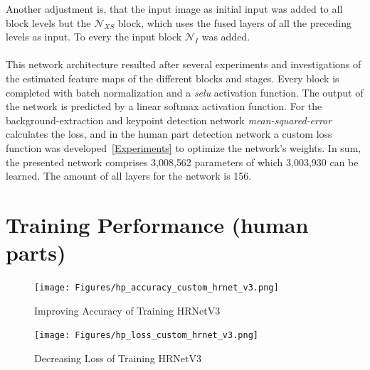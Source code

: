 Another adjustment is, that the input image as initial input was added to all block levels but the $\mathcal{N}_{XS}$
block, which uses the fused layers of all the preceding levels as input.
To every the input block $\mathcal{N}_I$ was added.
\\\mbox{}\\
This network architecture resulted after several experiments and investigations of the estimated feature maps of the
different blocks and stages.
Every block is completed with batch normalization and a \textit{selu} activation function.
The output of the network is predicted by a linear softmax activation function.
For the background-extraction and keypoint detection network \textit{mean-squared-error} calculates the loss, and in the
human part detection network a custom loss function was developed~\autoref{Experiments} to optimize the network's weights.
In sum, the presented network comprises 3,008,562 parameters of which 3,003,930 can be learned.
The amount of all layers for the network is 156.\\







\section{Training Performance (human parts)}
\begin{figure}
    \centering
    \texttt{[image: Figures/hp\_accuracy\_custom\_hrnet\_v3.png]}
    \decoRule
    \caption[HRNetv3 Training Process: Accuracy]{Improving Accuracy of Training HRNetV3}
    \label{fig:hp_accuracy_hrnet_v3}
\end{figure}
\begin{figure}
    \centering
    \texttt{[image: Figures/hp\_loss\_custom\_hrnet\_v3.png]}
    \decoRule
    \caption[HRNetv3 Training Process: Loss]{Decreasing Loss  of Training HRNetV3}
    \label{fig:hp_loss_hrnet_v3}
\end{figure}

